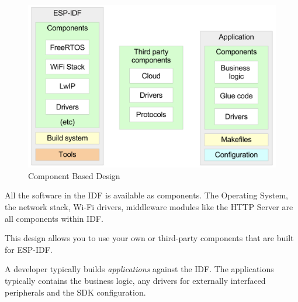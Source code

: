\documentclass[main.tex]{subfiles}
\begin{document}
\begin{figure}[h]
    \centering
    \includegraphics[width=\textwidth]{Pictures/idf_comp.png}
    \caption{Component Based Design}
    \label{fig:idf_comp_design}
\end{figure}

All the software in the IDF is available as components. The Operating System, the network stack, Wi-Fi drivers, middleware modules like the HTTP Server are all components within IDF. 

This design allows you to use your own or third-party components that are built for ESP-IDF.

A developer typically builds \textit{applications} against the IDF. The applications typically contains the business logic, any drivers for externally interfaced peripherals and the SDK configuration.
\end{document}
